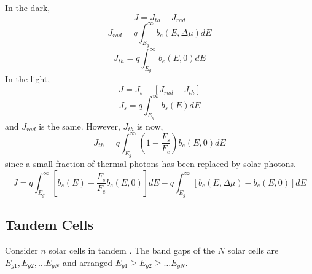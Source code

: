 \documentclass[12pt]{article}
\begin{document}
In the dark, 
\begin{equation}
J = J_{th} - J_{rad}
\end{equation}
\begin{equation}
J_{rad} = q \int_{E_g}^{\infty}  b_e (E, \Delta \mu)  dE
\end{equation}
\begin{equation} 
J_{th} = q \int_{E_g}^{\infty} b_e (E, 0) dE
\end{equation}
In the light, 
\begin{equation}
J = J_s - [J_{rad} -J_{th}] 
\end{equation}
\begin{equation}
J_s = q \int_{E_g}^{\infty} b_s(E) dE
\end{equation}
and $J_{rad}$ is the same.  However, $J_{th}$ is now, 
\begin{equation}
J_{th} = q \int_{E_g}^{\infty} \left ( 1 - \frac{F_s}{F_e}  \right ) b_e (E, 0) dE
\end{equation}
since a small fraction of thermal photons has been replaced by solar photons.  
\begin{equation}
J = q \int_{E_g}^{\infty} \left [ b_s(E) - \frac{F_s}{F_e} b_e(E, 0) \right ] dE - q \int_{E_g}^{\infty}   \left [ b_e (E, \Delta \mu)  - b_e (E, 0) \right ]  dE 
\end{equation}

\subsection{Tandem Cells}



Consider $n$ solar cells in tandem \cite{Vos:80}.  The band gaps of the $N$ solar cells are 
$E_{g1}, E_{g2},\ldots E_{gN}$ and arranged $E_{g1} \geq E_{g2} \geq \ldots E_{gN}$.  
\end{document}
